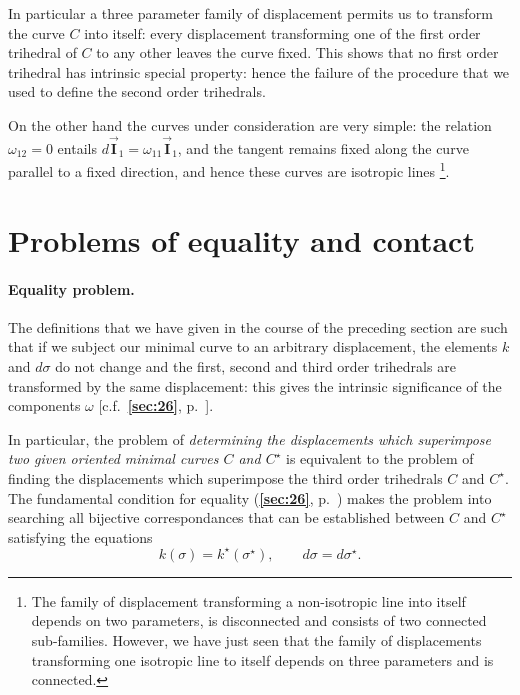 \documentclass[leqno,11pt]{book}
\numberwithin{equation}{chapter}
\theoremstyle{shape1}
\theoremstyle{shapesmall}
\newcommand{\fsref}[1]{{\rm\textsection\textbf{\ref{sec:#1}}}}
\newcommand{\str}{^{\star}}
\newcommand{\rvec}[1]{\vec{\mathbf{#1}}}
\newcommand{\ivec}{\rvec{I}}
\begin{document}
In particular a three parameter family of displacement permits us to transform the curve $C$ into itself: every displacement transforming one of the first order trihedral of $C$ to any other leaves the curve fixed. This shows that no first order trihedral has intrinsic special property: hence the failure of the procedure that we used to define the second order trihedrals.

On the other hand the curves under consideration are very simple: the relation $\omega_{12}=0$ entails $d\ivec_{1}=\omega_{11}\ivec_{1}$, and the tangent remains fixed along the curve parallel to a fixed direction, and hence these curves are isotropic lines \footnote{The family of displacement transforming a non-isotropic line into itself depends on two parameters, is disconnected and consists of two connected sub-families. However, we have just seen that the family of displacements transforming one isotropic line to itself depends on three parameters and is connected.}.


\section{Problems of equality and contact}
\label{sec:probl-equal-cont}

\paragraph{Equality problem.}
\label{sec:31}
The definitions that we have given in the course of the preceding section are such that if we subject our minimal curve to an arbitrary displacement, the elements $k$ and $d\sigma$ do not change and the first, second and third order trihedrals are transformed by the same displacement: this gives the intrinsic significance of the components $\omega$ [c.f.~\fsref{26}, p.~\pageref{sec:26}].

In particular, the problem of \emph{determining the displacements which superimpose two given oriented minimal curves $C$ and $C\str$} is equivalent to the problem of finding the displacements which superimpose the third order trihedrals $C$ and $C\str$. The fundamental condition for equality (\fsref{26}, p.~\pageref{sec:26}) makes the problem into searching all bijective correspondances that can be established between $C$ and $C\str$ satisfying the equations
\begin{equation}
  \label{eq:2.21}
  k(\sigma)=k\str(\sigma\str),\qquad d\sigma=d\sigma\str.
\end{equation}
\end{document}
